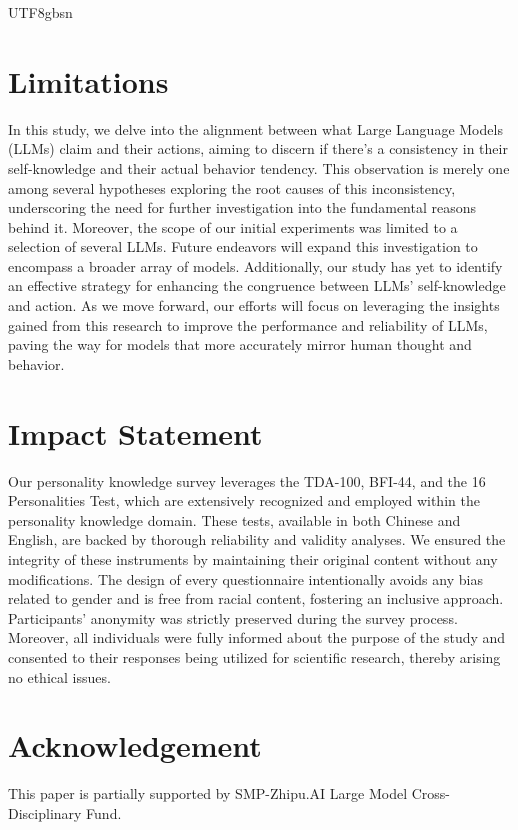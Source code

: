 \documentclass{article}
\theoremstyle{plain}
\theoremstyle{definition}
\theoremstyle{remark}
\begin{document}
\begin{CJK*}{UTF8}{gbsn}
\section*{Limitations}
In this study, we delve into the alignment between what Large Language Models (LLMs) claim and their actions, aiming to discern if there's a consistency in their self-knowledge and their actual behavior tendency. This observation is merely one among several hypotheses exploring the root causes of this inconsistency, underscoring the need for further investigation into the fundamental reasons behind it. Moreover, the scope of our initial experiments was limited to a selection of several LLMs. Future endeavors will expand this investigation to encompass a broader array of models. Additionally, our study has yet to identify an effective strategy for enhancing the congruence between LLMs' self-knowledge and action. As we move forward, our efforts will focus on leveraging the insights gained from this research to improve the performance and reliability of LLMs, paving the way for models that more accurately mirror human thought and behavior.

\section*{Impact Statement}
Our personality knowledge survey leverages the TDA-100, BFI-44, and the 16 Personalities Test, which are extensively recognized and employed within the personality knowledge domain. These tests, available in both Chinese and English, are backed by thorough reliability and validity analyses. We ensured the integrity of these instruments by maintaining their original content without any modifications. The design of every questionnaire intentionally avoids any bias related to gender and is free from racial content, fostering an inclusive approach. Participants’ anonymity was strictly preserved during the survey process. Moreover, all individuals were fully informed about the purpose of the study and consented to their responses being utilized for scientific research, thereby arising no ethical issues.

\section*{Acknowledgement}
This paper is partially supported by SMP-Zhipu.AI Large Model Cross-Disciplinary Fund.



\end{CJK*}
\end{document}
